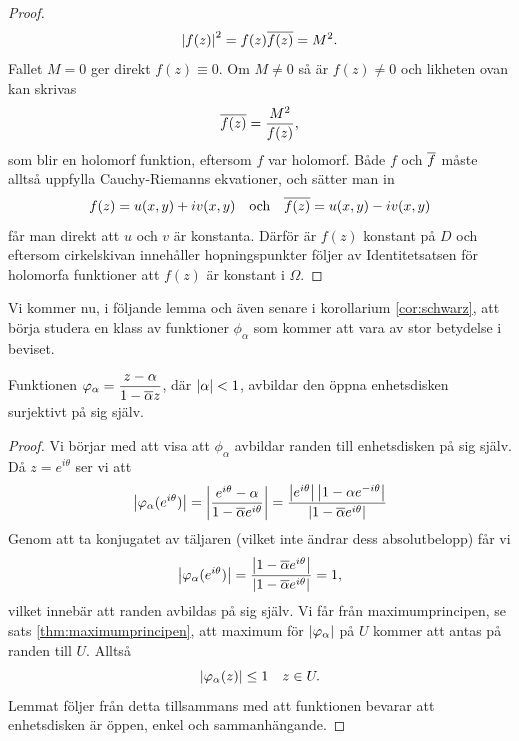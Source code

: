 \begin{proof}
	\begin{equation*}
		\left\lvert f(z) \right\rvert^2 = f(z)\overline{f(z)} = M^2.
	\end{equation*}
	Fallet $M=0$ ger direkt $f(z) \equiv 0$. Om $M\neq 0 $ så är $f(z) \neq 0$ och likheten ovan kan skrivas
	\begin{equation*}
		\overline{f(z)} = \frac{M^2}{f(z)},
	\end{equation*}
	som blir en holomorf funktion, eftersom $f$ var holomorf. Både $f$ och $\overline{f}$ måste alltså uppfylla Cauchy-Riemanns ekvationer, och sätter man in
	\begin{equation*}
		f(z) = u(x, y) + iv(x, y) \quad \text{och} \quad \overline{f(z)} = u(x, y) - iv(x, y)
	\end{equation*}
	får man direkt att $u$ och $v$ är konstanta. Därför är $f(z)$ konstant på $D$ och eftersom cirkelskivan innehåller hopningspunkter följer av Identitetsatsen för holomorfa funktioner att $f(z)$ är konstant i $\Omega$.
\end{proof}

Vi kommer nu, i följande lemma och även senare i korollarium \ref{cor:schwarz}, att börja studera en klass av funktioner $\phi_\alpha$ som kommer att vara av stor betydelse i beviset.

\begin{lemma}\label{lem:phi_bijec}
	Funktionen $\varphi_\alpha = \dfrac{z - \alpha}{1 - \overline{\alpha}z}$, där $\left\lvert \alpha \right\rvert < 1$, avbildar den öppna enhetsdisken surjektivt på sig själv.
\end{lemma}

\begin{proof}
	Vi börjar med att visa att $\phi_\alpha$ avbildar randen till enhetsdisken på sig själv. Då $z = e^{i \theta}$ ser vi att
	\begin{equation*}
		\left\lvert \varphi_\alpha(e^{i \theta}) \right\rvert = \left\lvert \frac{e^{i \theta} - \alpha}{1 - \overline{\alpha}e^{i \theta}} \right\rvert = \frac{\left\lvert e^{i \theta} \right\rvert\left\lvert 1 - \alpha e^{-i \theta} \right\rvert}{\left\lvert 1- \overline{\alpha}e^{i\theta} \right\rvert}
	\end{equation*}
	Genom att ta konjugatet av täljaren (vilket inte ändrar dess absolutbelopp) får vi
	\begin{equation*}
		\left\lvert \varphi_\alpha(e^{i \theta}) \right\rvert = \frac{\left\lvert 1 - \overline{\alpha} e^{i \theta} \right\rvert}{\left\lvert 1- \overline{\alpha}e^{i\theta} \right\rvert} = 1,
	\end{equation*}
	vilket innebär att randen avbildas på sig själv. Vi får från maximumprincipen, se sats \ref{thm:maximumprincipen}, att maximum för $\left\lvert \varphi_\alpha \right\rvert$ på $U$ kommer att antas på randen till $U$. Alltså
	\begin{equation*}
		\left\lvert \varphi_\alpha(z) \right\rvert \le 1 \quad z \in U.
	\end{equation*}
	Lemmat följer från detta tillsammans med att funktionen bevarar att enhetsdisken är öppen, enkel och sammanhängande.
\end{proof}

